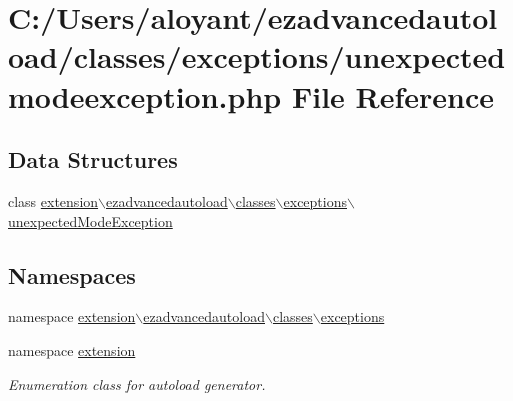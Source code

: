 \hypertarget{unexpectedmodeexception_8php}{\section{C\-:/\-Users/aloyant/ezadvancedautoload/classes/exceptions/unexpectedmodeexception.php File Reference}
\label{unexpectedmodeexception_8php}
}
\subsection*{Data Structures}
\begin{DoxyCompactItemize}
\item 
class \hyperlink{classextension_1_1ezadvancedautoload_1_1classes_1_1exceptions_1_1unexpected_mode_exception}{extension$\backslash$ezadvancedautoload$\backslash$classes$\backslash$exceptions$\backslash$unexpected\-Mode\-Exception}
\end{DoxyCompactItemize}
\subsection*{Namespaces}
\begin{DoxyCompactItemize}
\item 
namespace \hyperlink{namespaceextension_1_1ezadvancedautoload_1_1classes_1_1exceptions}{extension$\backslash$ezadvancedautoload$\backslash$classes$\backslash$exceptions}
\item 
namespace \hyperlink{namespaceextension}{extension}
\begin{DoxyCompactList}\small\item\em Enumeration class for autoload generator. \end{DoxyCompactList}\end{DoxyCompactItemize}
